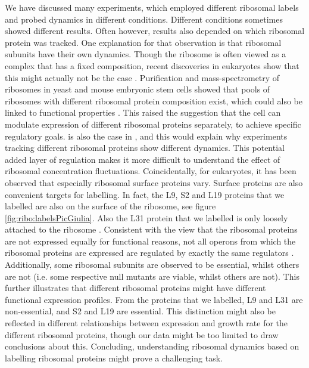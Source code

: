 We have discussed many experiments, which employed different ribosomal labels and probed dynamics in different conditions.
%
Different conditions sometimes showed different results.
%
Often however, results also depended on which ribosomal protein was tracked.
%
One explanation for that observation is that ribosomal subunits have their own dynamics.
%
Though the ribosome is often viewed as a complex that has a fixed composition, 
recent discoveries in eukaryotes show that this might actually not be the case \cite{Preiss2016, Slavov2015}.
%
Purification and mass-spectrometry of ribosomes in yeast and mouse embryonic stem cells showed that 
pools of ribosomes with different ribosomal protein composition exist, which could also be linked to functional properties \cite{Slavov2015}.
%
This raised the suggestion that the cell can modulate expression of different ribosomal proteins separately, 
to achieve specific regulatory goals.
%
 is also the case in \ecoli, and this would explain why experiments tracking different ribosomal proteins show different dynamics.
%
This potential added layer of regulation makes it more difficult to understand the effect of ribosomal concentration fluctuations.
Coincidentally, for eukaryotes, it has been observed that especially ribosomal surface proteins vary.
Surface proteins are also convenient targets for labelling.
In fact, the L9, S2 and L19 proteins that we  labelled are also on the surface of the ribosome, see figure \ref{fig:ribo:labelsPicGiulia}.
Also the L31 protein that we labelled is only loosely attached to the ribosome \cite{Walker2016t}.
%
Consistent with the view that the ribosomal proteins are not expressed equally for functional reasons, 
not all operons from which the ribosomal proteins are expressed are regulated by exactly the same regulators \cite{Keseler2017}.
%
Additionally, some ribosomal subunits are observed to be essential, whilst others are not (i.e. some respective null mutants are viable, whilst others are not).
This further illustrates that different ribosomal proteins might have different functional expression profiles.
%
From the proteins that we labelled, L9 and L31 are non-essential, and S2 and L19 are essential.
%
This distinction might also be reflected in different relationships between expression and growth rate for the different ribosomal proteins, 
though our data might be too limited to draw conclusions about this.
%
%
Concluding, understanding ribosomal dynamics based on labelling ribosomal proteins might prove a challenging task.

